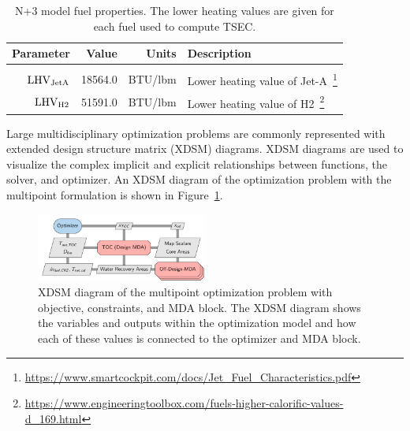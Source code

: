 \documentclass[conf]{new-aiaa}
\begin{document}
\begin{table}[hbt!]
    \centering
    \caption{
        N+3 model fuel properties.
        The lower heating values are given for each fuel used to compute TSEC.}
    \begin{tabular}{r r r l}
        \hline
        Parameter              & Value   & Units        & Description                                                                                                            \\
        \hline                                                                                                                                                                   \\
        $\rm{LHV}_{\rm{JetA}}$ & 18564.0 & \si{BTU/lbm} & Lower heating value of Jet-A~\footnote{\url{https://www.smartcockpit.com/docs/Jet_Fuel_Characteristics.pdf}}           \\
        $\rm{LHV}_{\rm{H2}}$   & 51591.0 & \si{BTU/lbm} & Lower heating value of H2~\footnote{\url{https://www.engineeringtoolbox.com/fuels-higher-calorific-values-d_169.html}} \\
        \hline
    \end{tabular}
    \label{fuel_props}
\end{table}

Large multidisciplinary optimization problems are commonly represented with extended design structure matrix (XDSM) diagrams.
XDSM diagrams are used to visualize the complex implicit and explicit relationships between functions, the solver, and optimizer.
An XDSM diagram of the optimization problem with the multipoint formulation is shown in Figure~\ref{fig:N3_opt_xdsm}.

\begin{figure}[!hbt]
    \centering
    \includegraphics[width=0.5\textwidth]{N3_opt_XDSM.pdf}
    \caption{
        XDSM diagram of the multipoint optimization problem with objective, constraints, and MDA block.
        The XDSM diagram shows the variables and outputs within the optimization model and how each of these values is connected to the optimizer and MDA block.}
    \label{fig:N3_opt_xdsm}
\end{figure}
\end{document}
